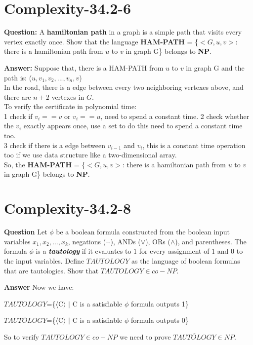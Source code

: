 \documentclass[12pt]{article}
\begin{document}
\section{Complexity-34.2-6}
\textbf{Question:}
A \textbf{hamiltonian path} in a graph is a simple path that visits every vertex exactly once. Show that the language \textbf{HAM-PATH} = \{$<G, u, v>$: there is a hamiltonian path from $u$ to $v$ in graph G\} belongs to \textbf{NP}.

\textbf{Answer:}
Suppose that, there is a HAM-PATH from $u$ to $v$ in graph G and the path is: ($u, v_1, v_2,...,v_n, v$)\\
In the road, there is a edge between every two neighboring vertexes above, and there are $n+2$ vertexes in $G$.\\
To verify the certificate in polynomial time:\\
1 check if $v_i == v$ or $v_i == u$, need to spend a constant time.
2 check whether the $v_i$ exactly appears once, use a set to do this need to spend a constant time too.\\
3 check if there is a edge between $v_{i-1}$ and $v_i$, this is a constant time operation too if we use data structure like a two-dimensional array.\\
So, the \textbf{HAM-PATH} = \{$<G, u, v>$: there is a hamiltonian path from $u$ to $v$ in graph G\} belongs to \textbf{NP}.

\section{Complexity-34.2-8}
\textbf{Question}
Let $\phi$ be a boolean formula constructed from the boolean input variables $x_1, x_2, \dots, x_k$, negations ($\neg$), ANDs ($\vee$), ORs ($\wedge$), and parentheses. The formula $\phi$ is a \textit{\textbf{tautology}} if it evaluates to $1$ for every assignment of $1$ and $0$ to the input variables. Define $TAUTOLOGY$ as the language of boolean formulas that are tautologies. Show that $TAUTOLOGY \in co-NP$.

\textbf{Answer}
Now we have:

 $TAUTOLOGY$=\{$\langle$C$\rangle$ $\mid$ C is a satisfiable $\phi$ formula outputs 1\}
 
 
 $\overline{TAUTOLOGY} $=\{$\langle$C$\rangle$ $\mid$ C is a satisfiable $\phi$ formula outputs 0\}
 
So to verify $TAUTOLOGY \in co-NP$ we need to prove $\overline{TAUTOLOGY} \in NP$. 
 
\end{document}
